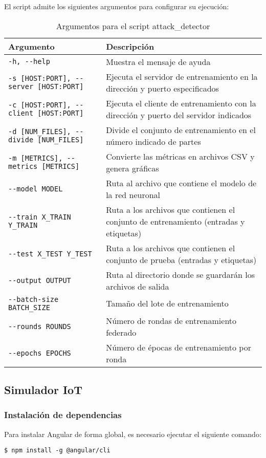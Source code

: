 El script admite los siguientes argumentos para configurar su ejecución:
\begin{table}[h]
	\centering
	\begin{tabularx}{\linewidth}{ p{} X }
		\toprule
		\textbf{Argumento} & \textbf{Descripción} \\
		\toprule
        \texttt{-h, -{}-help} & Muestra el mensaje de ayuda \\
        \texttt{-s [HOST:PORT], -{}-server [HOST:PORT]} & Ejecuta el servidor de entrenamiento en la dirección y puerto especificados \\
        \texttt{-c [HOST:PORT], -{}-client [HOST:PORT]} & Ejecuta el cliente de entrenamiento con la dirección y puerto del servidor indicados \\
        \texttt{-d [NUM\_FILES], -{}-divide [NUM\_FILES]} & Divide el conjunto de entrenamiento en el número indicado de partes \\
        \texttt{-m [METRICS], -{}-metrics [METRICS]} & Convierte las métricas en archivos CSV y genera gráficas \\
        \texttt{-{}-model MODEL} & Ruta al archivo que contiene el modelo de la red neuronal \\
        \texttt{-{}-train X\_TRAIN Y\_TRAIN} & Ruta a los archivos que contienen el conjunto de entrenamiento (entradas y etiquetas) \\
        \texttt{-{}-test X\_TEST Y\_TEST} & Ruta a los archivos que contienen el conjunto de prueba (entradas y etiquetas) \\
        \texttt{-{}-output OUTPUT} & Ruta al directorio donde se guardarán los archivos de salida \\
        \texttt{-{}-batch-size BATCH\_SIZE} & Tamaño del lote de entrenamiento \\
        \texttt{-{}-rounds ROUNDS} & Número de rondas de entrenamiento federado \\
        \texttt{-{}-epochs EPOCHS} & Número de épocas de entrenamiento por ronda \\
		\bottomrule
	\end{tabularx}
	\caption{Argumentos para el script attack\_detector}
\end{table}

\newpage
\subsection{Simulador IoT}
\label{subsec:ConfiguracionSimuladorIoT}
\subsubsection{Instalación de dependencias}
\label{subsubsec:InstalacionDependencias}
Para instalar Angular de forma global, es necesario ejecutar el siguiente comando:
\begin{verbatim}
$ npm install -g @angular/cli
\end{verbatim}

